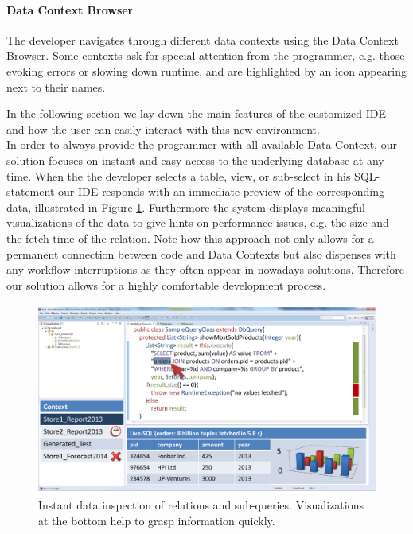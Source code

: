 \paragraph{Data Context Browser} The developer navigates through different data contexts using the Data Context Browser. Some contexts ask for special attention from the programmer, e.g. those evoking errors or slowing down runtime, and are highlighted by an icon appearing next to their names. %

In the following section we lay down the main features of the customized IDE and how the user can easily interact with this new environment.\\
In order to always provide the programmer with all available Data Context, our solution focuses on instant and easy access to the underlying database at any time. When the the developer selects a table, view, or sub-select in his SQL-statement our IDE responds with an immediate preview of the corresponding data, illustrated in Figure \ref{fig:final_prototype_instant}. Furthermore the system displays meaningful visualizations of the data to give hints on performance issues, e.g. the size and the fetch time of the relation. Note how this approach not only allows for a permanent connection between code and Data Contexts but also dispenses with any workflow interruptions as they often appear in nowadays solutions. Therefore our solution allows for a highly comfortable development process.\\
\begin{figure}
\begin{centering}
    \includegraphics[width=1.0\linewidth]{images/instant}
    \caption{Instant data inspection of relations and sub-queries. Visualizations at the bottom help to grasp information quickly.}
    \label{fig:final_prototype_instant}
\end{centering}
\end{figure}
